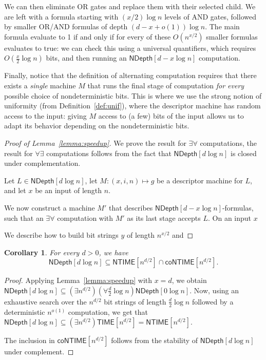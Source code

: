 \documentclass[a4paper, 11pt]{article}
\theoremstyle{plain}
\newtheorem{corollary}[theorem]{Corollary}
\theoremstyle{definition}
\theoremstyle{remark}
\newcommand{\TIME}{\textsf{TIME}}%
\newcommand{\NTIME}{\textsf{NTIME}}%
\newcommand{\coNTIME}{\textsf{coNTIME}}%
\newcommand{\ND}{\textsf{NDepth}}%
\newcommand{\NDL}[1]{\ND[ #1 \log n]}%
\newcommand{\todohere}{\todo[inline]{TODO}}%
\begin{document}
We can then eliminate OR gates and replace them with their selected child.
We are left with a formula starting with $(x/2)\log n$ levels of AND gates, 
followed by smaller OR/AND formulas of depth $(d-x + o(1)) \log n$.
The main formula evaluate to 1 if and only if for every of these $O(n^{x/2})$
smaller formulas evaluates to true: 
we can check this using a universal quantifiers, 
which requires $O(\frac{x}{2}\log n)$ bits, and then running an $\NDL{d-x}$ computation.

Finally, notice that the definition of alternating computation
requires that there exists a \textit{single} machine $M$ that runs the
final stage of computation \textit{for every} possible choice of nondeterministic bits.
This is where we use the strong notion of uniformity (from Definition~\ref{def:unif}), where the descriptor machine
has random access to the input: giving $M$ access to (a few) bits of the input
allows us to adapt its behavior depending on the nondeterministic bits. 

\begin{proof}[Proof of Lemma~\ref{lemma:speedup}]
	We prove the result for $\exists\forall$ computations, 
	the result for $\forall\exists$ computations follows from the fact
	that $\NDL{d}$ is closed under complementation.
	
	Let $L\in\NDL{d}$, let $M : (x,i,n) \mapsto g$ be 
	a descriptor machine for $L$, and let $x$ be an input of length $n$.
	
	We now construct a machine $M'$ that describes $\NDL{d-x}$-formulas,
	such that an $\exists\forall$ computation with $M'$ as its last stage accepts $L$.
	On an input $x$

	We describe how to build bit strings $y$ of length $n^{x/2}$ and
	\todohere 
\end{proof}


\begin{corollary}\label{cor:speedup}
	For every $d > 0$, we have
	\[\NDL{d} \subseteq \NTIME[n^{d/2}] \cap \coNTIME[n^{d/2}].\]
\end{corollary}
\begin{proof}
	Applying Lemma~\ref{lemma:speedup} with $x = d$, we obtain
	$\NDL{d} \subseteq (\exists n^{d/2}) (\forall \frac{d}{2}\log n) \NDL{0}$.
	Now, using an exhaustive search over the $n^{d/2}$ bit strings of length $\frac{d}{2}\log n$
	followed by a deterministic $n^{o(1)}$ computation, we get that
	$\NDL{d} \subseteq (\exists n^{d/2}) \TIME[n^{d/2}] = \NTIME[n^{d/2}]$.

	The inclusion in $\coNTIME[n^{d/2}]$ follows from the stability of $\NDL{d}$
	under complement.
\end{proof}
\end{document}
